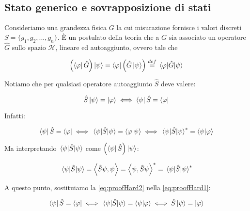 \subsection{Stato generico e sovrapposizione di stati}

Consideriamo una grandezza fisica $G$ la cui misurazione fornisce i valori discreti $S = \{g_1, g_2, ..., g_n\}$. \`E un postulato della teoria che a $G$ sia associato un operatore $\hat{G}$ sullo spazio $\mathcal{H}$, lineare ed autoaggiunto, ovvero tale che

    \begin{equation}
        \left ( \bra{\varphi} \hat{G} \right ) \ket{\psi} =
        \bra{\varphi} \left ( \hat{G} \ket{\psi} \right ) \overset{def}{=}
        \mel{\varphi}{\hat{G}}{\psi}
    \end{equation}

Notiamo che per qualsiasi operatore autoaggiunto $\hat{S}$ deve valere:
    
    \begin{equation} \label{eq:proofHard0}
        \hat{S} \ket{\psi} = \ket{\varphi} \iff \bra{\psi} \hat{S} = \bra{\varphi}
    \end{equation}
    
Infatti:

    \begin{equation} \label{eq:proofHard1}
        \bra{\psi} \hat{S} = \bra{\varphi} \iff 
        \mel{\psi}{\hat{S}}{\psi} = \braket{\varphi}{\psi} \iff
        \mel{\psi}{\hat{S}}{\psi}^* = \braket{\psi}{\varphi}
    \end{equation}  
    
Ma interpretando $\mel{\psi}{\hat{S}}{\psi}$ come $\left ( \bra{\psi} \hat{S} \right ) \ket{    \psi}$:

    \begin{equation} \label{eq:proofHard2}
        \mel{\psi}{\hat{S}}{\psi} = \left \langle \hat{S} \psi, \psi \right \rangle =
        \left \langle \psi, \hat{S} \psi \right \rangle^* = \mel{\psi}{\hat{S}}{\psi}^*
    \end{equation}
    
A questo punto, sostituiamo la \eqref{eq:proofHard2} nella \eqref{eq:proofHard1}:

    \begin{equation} \label{eq:proofHard3}
        \bra{\psi} \hat{S} = \bra{\varphi} \iff \mel{\psi}{\hat{S}}{\psi} = \braket{\psi}{\varphi} \iff \hat{S} \ket{\psi}  = \ket{\varphi}
    \end{equation}

